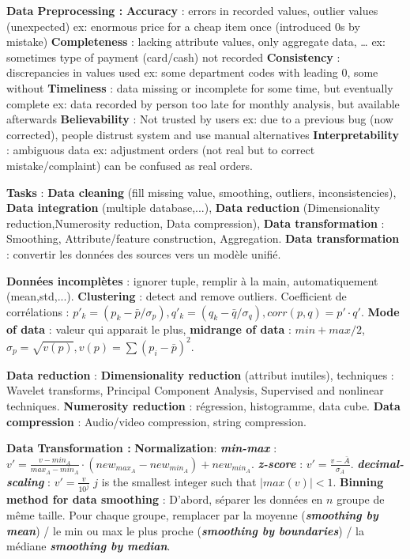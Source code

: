 \documentclass[9pt,a4paper]{report}
\author{Sylvain Julmy}
\begin{document}
\textbf{Data Preprocessing :}
\textbf{Accuracy} : errors in recorded values, outlier values (unexpected) ex: enormous price for a cheap item once (introduced 0s by mistake)
\textbf{Completeness} : lacking attribute values, only aggregate data, … ex: sometimes type of payment (card/cash) not recorded
\textbf{Consistency} : discrepancies in values used ex: some department codes with leading 0, some without
\textbf{Timeliness} : data missing or incomplete for some time, but eventually complete ex: data recorded by person too late for monthly analysis, but available afterwards
\textbf{Believability} : Not trusted by users ex: due to a previous bug (now corrected), people distrust system and use manual alternatives
\textbf{Interpretability} : ambiguous data ex: adjustment orders (not real but to correct mistake/complaint) can be confused as real orders.

\textbf{Tasks} : \textbf{Data cleaning} (fill missing value, smoothing, outliers, inconsistencies), \textbf{Data integration} (multiple database,...), \textbf{Data reduction} (Dimensionality reduction,Numerosity reduction, Data compression), \textbf{Data transformation} : Smoothing, Attribute/feature construction, Aggregation. \textbf{Data transformation} : convertir les données des sources vers un modèle unifié.

\textbf{Données incomplètes} : ignorer tuple, remplir à la main, automatiquement (mean,std,...). \textbf{Clustering} : detect and remove outliers. Coefficient de corrélations : $p'_k = (p_k-\bar{p}/\sigma_p), q'_k = (q_k-\bar{q}/\sigma_q), corr(p,q)=p'\cdot q'$. \textbf{Mode of data} : valeur qui apparait le plus, \textbf{midrange of data} : $min + max / 2$, $\sigma_p=\sqrt{v(p)}, v(p)=\sum (p_i-\bar{p})^2$.

\textbf{Data reduction} : \textbf{Dimensionality reduction} (attribut inutiles), techniques : Wavelet transforms, Principal Component Analysis, Supervised and nonlinear techniques. \textbf{Numerosity reduction} : régression, histogramme, data cube. \textbf{Data compression} : Audio/video compression, string compression.

\textbf{Data Transformation :} \textbf{Normalization}: \textit{\textbf{min-max}} : $v'=\frac{v - min_A}{max_A - min_A}\cdot (new_{max_A} - new_{min_A})+new_{min_A}$. \textit{\textbf{z-score}} : $v'=\frac{v-\bar{A}}{\sigma_A}$. \textit{\textbf{decimal-scaling}} : $v'=\frac{v}{10^j}$  $j$ is the smallest integer such that $|max(v)| < 1$. \textbf{Binning method for data smoothing} : D'abord, séparer les données en $n$ groupe de même taille. Pour chaque groupe, remplacer par la moyenne (\textit{\textbf{smoothing by mean}}) / le min ou max le plus proche (\textit{\textbf{smoothing by boundaries}}) / la médiane \textit{\textbf{smoothing by median}}.
\end{document}
